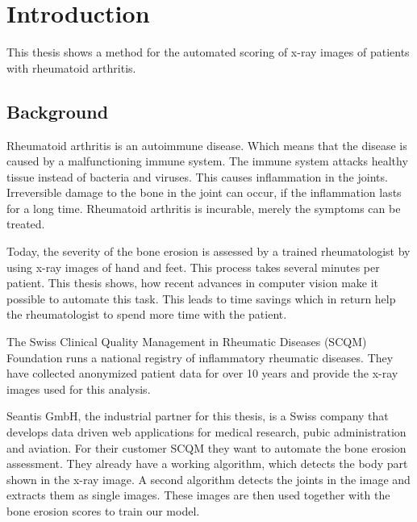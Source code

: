 \documentclass[12pt]{article}
\begin{document}
\newpage

\tableofcontents

\newpage

\section{Introduction}

This thesis shows a method for the automated scoring of x-ray images of patients with rheumatoid arthritis. 

\subsection{Background}

Rheumatoid arthritis is an autoimmune disease. Which means that the disease is caused by a malfunctioning immune system. The immune system attacks healthy tissue instead of bacteria and viruses. This causes inflammation in the joints. Irreversible damage to the bone in the joint can occur, if the inflammation lasts for a long time. \cite{rheuma} Rheumatoid arthritis is incurable, merely the symptoms can be treated.

Today, the severity of the bone erosion is assessed by a trained rheumatologist by using x-ray images of hand and feet. This process takes several minutes per patient. This thesis shows, how recent advances in computer vision make it possible to automate this task. This leads to time savings which in return help the rheumatologist to spend more time with the patient.

The Swiss Clinical Quality Management in Rheumatic Diseases (SCQM) Foundation runs a national registry of inflammatory rheumatic diseases. \cite{scqm_about} They have collected anonymized patient data for over 10 years and provide the x-ray images used for this analysis.

Seantis GmbH, the industrial partner for this thesis, is a Swiss company that develops data driven web applications for medical research, pubic administration and aviation. \cite{seantis_about} For their customer SCQM they want to automate the bone erosion assessment. They already have a working algorithm, which detects the body part shown in the x-ray image. A second algorithm detects the joints in the image and extracts them as single images. These images are then used together with the bone erosion scores to train our model.

\end{document}
